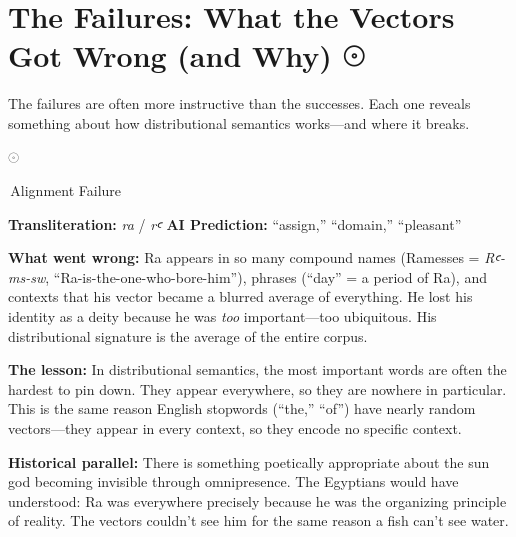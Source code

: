 \documentclass[11pt, a4paper]{article}
\newcommand{\hiero}[1]{{\normalfont\hierofont #1}}
\newcommand{\bighiero}[1]{{\normalfont\hierofont\fontsize{48}{56}\selectfont #1}}
\newcommand{\displayglyph}[1]{%
  \begin{center}
  \bighiero{#1}
  \end{center}
  \vspace{-6pt}
}
\newcommand{\methodtag}[1]{%
  \noindent\colorbox{tagbg}{\small\sffamily\color{nightsky}\,#1\,}\par\smallskip%
}
\newenvironment{insightbox}[1][]{%
  \def\boxtitle{#1}%
  \begin{oframed}%
  \noindent{\bfseries\color{lapis}\boxtitle}\par\smallskip%
}{%
  \end{oframed}%
}
\begin{document}
\section{The Failures: What the Vectors Got Wrong (and Why) \hfill \hiero{𓇳}}

\noindent
The failures are often more instructive than the successes. Each one reveals something about how distributional semantics works---and where it breaks.

\medskip

\begin{insightbox}[\textit{ra} --- The Sun God Who Became Noise]

\displayglyph{𓇳}

\methodtag{Alignment Failure}

\textbf{Transliteration:} \textit{ra} / \textit{rꜥ} \quad
\textbf{AI Prediction:} ``assign,'' ``domain,'' ``pleasant''

\medskip
\textbf{What went wrong:} Ra appears in so many compound names (Ramesses = \textit{Rꜥ-ms-sw}, ``Ra-is-the-one-who-bore-him''), phrases (``day'' = a period of Ra), and contexts that his vector became a blurred average of everything. He lost his identity as a deity because he was \emph{too} important---too ubiquitous. His distributional signature is the average of the entire corpus.

\medskip
\textbf{The lesson:} In distributional semantics, the most important words are often the hardest to pin down. They appear everywhere, so they are nowhere in particular. This is the same reason English stopwords (``the,'' ``of'') have nearly random vectors---they appear in every context, so they encode no specific context.

\medskip
\textbf{Historical parallel:} There is something poetically appropriate about the sun god becoming invisible through omnipresence. The Egyptians would have understood: Ra was everywhere precisely because he was the organizing principle of reality. The vectors couldn't see him for the same reason a fish can't see water.
\end{insightbox}
\end{document}

